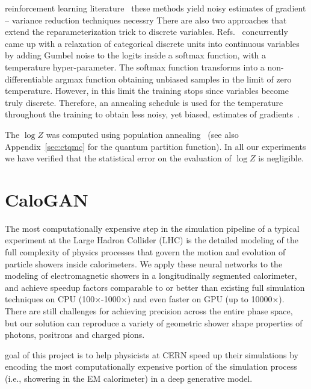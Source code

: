 reinforcement learning
literature~\cite{paisley2012variational, mnih2014neural, gu2015muprop}
these methods yield noisy estimates of gradient --  variance reduction
techniques necessry
There are also two approaches that
extend the reparameterization trick to discrete variables.
Refs.~\cite{jang2016categorical, maddison2016concrete} concurrently came up with
a relaxation of categorical discrete units into continuous variables by adding
Gumbel noise to the logits inside a softmax function, with a temperature
hyper-parameter. The softmax function transforms into a non-differentiable
argmax function obtaining unbiased samples in the limit of zero temperature.
However, in this limit the training stops since variables become truly discrete.
Therefore, an annealing schedule is used for the temperature throughout the
training to obtain less noisy, yet biased, estimates of
gradients~\cite{jang2016categorical}. 

The $\log Z$
was computed using population annealing~\cite{hukushima2003population,
machta2010population} (see also Appendix~\ref{sec:ctqmc} for the quantum
partition function). In all our experiments we have verified that the
statistical error on the evaluation of $\log Z$ is negligible.  





\section{CaloGAN}

The most computationally expensive step in the simulation pipeline of a typical
experiment at the Large Hadron Collider (LHC) is the detailed modeling of the
full complexity of physics processes that govern the motion and evolution of
particle showers inside calorimeters. We apply these neural networks to the
modeling of electromagnetic showers in a longitudinally segmented calorimeter,
and achieve speedup factors comparable to or better than existing full
simulation techniques on CPU (100×-1000×) and even faster on GPU (up to 10000×).
There are still challenges for achieving precision across the entire phase
space, but our solution can reproduce a variety of geometric shower shape
properties of photons, positrons and charged pions.
 
goal of this project is to help physicists at CERN speed up their simulations by
encoding the most computationally expensive portion of the simulation process
(i.e., showering in the EM calorimeter) in a deep generative model.

